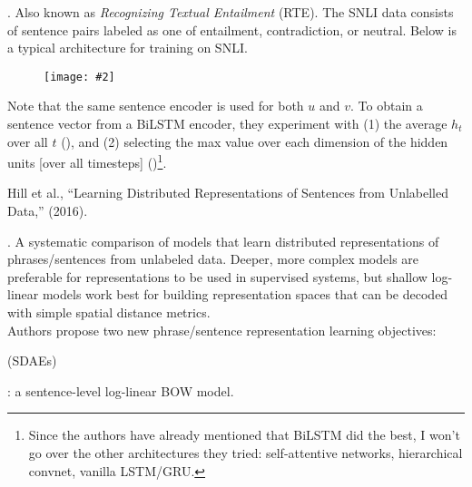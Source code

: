 \documentclass[11pt]{article}
\newcommand\myfig[2][0.3\textwidth]{\begin{figure}[h!]\centering\texttt{[image: \#2]}\end{figure}}
\newcommand\myspace[1][]{\vspace{#1\bigskipamount}}
\newcommand\p{\Needspace{10\baselineskip} \noindent}
\begin{document}
\myspace
\p {}. Also known as \textit{Recognizing Textual Entailment} (RTE). The SNLI data consists of sentence pairs labeled as one of entailment, contradiction, or neutral. Below is a typical architecture for training on SNLI.

\myfig[0.4\textwidth]{SNLI_diagram.png}

Note that the same sentence encoder is used for both $u$ and $v$. To obtain a sentence vector from a BiLSTM encoder, they experiment with (1) the average $h_t$ over all $t$ (), and (2) selecting the max value over each dimension of the hidden units [over all timesteps] ()\footnote{Since the authors have already mentioned that BiLSTM did the best, I won't go over the other architectures they tried: self-attentive networks, hierarchical convnet, vanilla LSTM/GRU.}.



\vspace{-1em}
{\footnotesize Hill et al., ``Learning Distributed Representations of Sentences from Unlabelled Data,'' (2016).}

\p {}. A systematic comparison of models that learn distributed representations of phrases/sentences from unlabeled data. Deeper, more complex models are preferable for representations to be used in supervised systems, but shallow log-linear models work best for building representation spaces that can be decoded with simple spatial distance metrics.\\

\p Authors propose two new phrase/sentence representation learning objectives:
\begin{compactenum}
	\item {} (SDAEs)
	
	\item {}: a sentence-level log-linear BOW model.
\end{compactenum}
\end{document}
